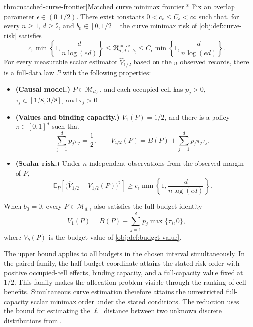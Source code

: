\documentclass[11pt]{article}
\begin{document}
\begin{theoremv}{thm:matched-curve-frontier}[Matched curve minimax frontier]*
Fix an overlap parameter \(\epsilon\in(0,1/2)\). There exist constants \(0<c_\epsilon\le C_\epsilon<\infty\) such that, for every \(n\ge1\), \(d\ge2\), and \(b_0\in[0,1/2]\), the curve minimax risk of \cref{obj:def:curve-risk} satisfies
\[
c_\epsilon\min\left\{1,\frac{d}{n\log(ed)}\right\}
\le \mathfrak R_{n,d,\epsilon,b_0}^{\mathrm{curve}}
\le C_\epsilon\min\left\{1,\frac{d}{n\log(ed)}\right\}.
\]
For every measurable scalar estimator \(\widehat V_{1/2}\) based on the \(n\) observed records, there is a full-data law \(P\) with the following properties:
\begin{itemize}
\item \textbf{(Causal model.)} \(P\in\mathcal M_{d,\epsilon}\), and each occupied cell has \(p_j>0\), \(\tau_j\in[1/8,3/8]\), and \(\tau_j>0\).
\item \textbf{(Values and binding capacity.)} \(V_1(P)=1/2\), and there is a policy \(\pi\in[0,1]^d\) such that
\[
\sum_{j=1}^{d}p_j\pi_j=\frac12,
\qquad
V_{1/2}(P)=B(P)+\sum_{j=1}^{d}p_j\pi_j\tau_j.
\]
\item \textbf{(Scalar risk.)} Under \(n\) independent observations from the observed margin of \(P\),
\[
\mathbb E_P\!\left[\bigl(\widehat V_{1/2}-V_{1/2}(P)\bigr)^2\right]
\ge c_\epsilon\min\left\{1,\frac{d}{n\log(ed)}\right\}.
\]
\end{itemize}
When \(b_0=0\), every \(P\in\mathcal M_{d,\epsilon}\) also satisfies the full-budget identity
\[
V_1(P)=B(P)+\sum_{j=1}^{d}p_j\max\{\tau_j,0\},
\]
where \(V_b(P)\) is the budget value of \cref{obj:def:budget-value}.
\end{theoremv}

The upper bound applies to all budgets in the chosen interval simultaneously. In the paired family, the half-budget coordinate attains the stated risk order with positive occupied-cell effects, binding capacity, and a full-capacity value fixed at \(1/2\). This family makes the allocation problem visible through the ranking of cell benefits. Simultaneous curve estimation therefore attains the unrestricted full-capacity scalar minimax order under the stated conditions. The reduction uses the bound for estimating the \(\ell_1\) distance between two unknown discrete distributions from \citet[Theorem~3 and the unknown-both-distributions reduction following Theorem~6]{JiaoHanWeissman2018}.
\end{document}
